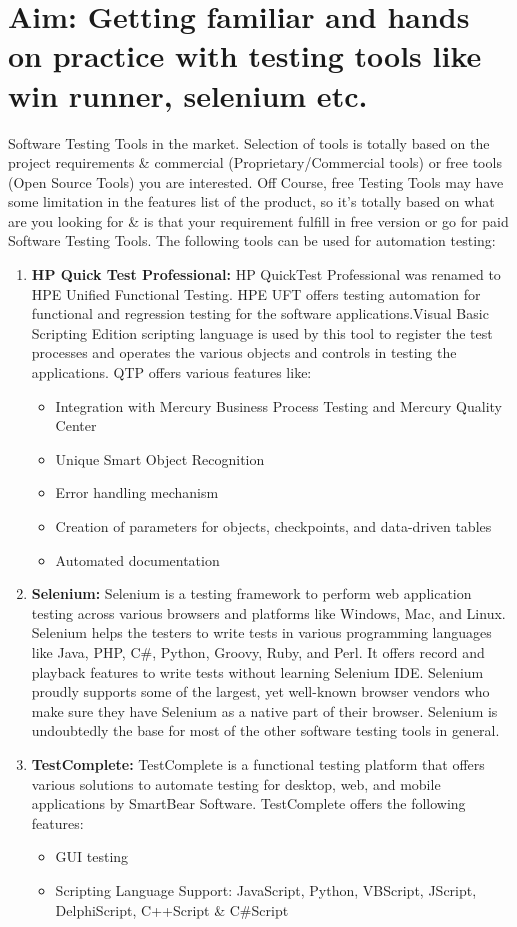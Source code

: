 \section*{\fontsize{16}{14}\selectfont Aim: Getting  familiar and hands on practice with testing tools like win runner, selenium etc.}
Software Testing Tools in the market. Selection of tools is totally based on the project requirements \& commercial (Proprietary/Commercial tools) or free tools (Open Source Tools) you are interested. Off Course, free Testing Tools may have some limitation in the features list of the product, so it’s totally based on what are you looking for \& is that your requirement fulfill in free version or go for paid Software Testing Tools.
The following tools can be used for automation testing:
\begin{enumerate}
\item \textbf{HP Quick Test Professional:}
HP QuickTest Professional was renamed to HPE Unified Functional Testing. HPE UFT offers testing automation for functional and regression testing for the software applications.Visual Basic Scripting Edition scripting language is used by this tool to register the  test processes and operates the various objects and controls in testing the applications.
QTP offers various features like:
\begin{itemize}
\item Integration with Mercury Business Process Testing and Mercury Quality Center
\item Unique Smart Object Recognition
\item Error handling mechanism
\item Creation of parameters for objects, checkpoints, and data-driven tables
\item Automated documentation
\end{itemize}
\item \textbf{Selenium:}
Selenium is a testing framework to perform web application testing across various browsers and platforms like Windows, Mac, and Linux. Selenium helps the testers to write tests in various programming languages like Java, PHP, C\#, Python, Groovy, Ruby, and Perl. It offers record and playback features to write tests without learning Selenium IDE.
Selenium proudly supports some of the largest, yet well-known browser vendors who make sure they have Selenium as a native part of their browser. Selenium is undoubtedly the base for most of the other software testing tools in general.

\item \textbf{TestComplete:}
TestComplete is a functional testing platform that offers various solutions to automate testing for desktop, web, and mobile applications by SmartBear Software.
TestComplete offers the following features:
\begin{itemize}
\item GUI testing
\item Scripting Language Support: JavaScript, Python, VBScript, JScript, DelphiScript, C++Script \& C\#Script
\end{itemize}


\end{enumerate}
